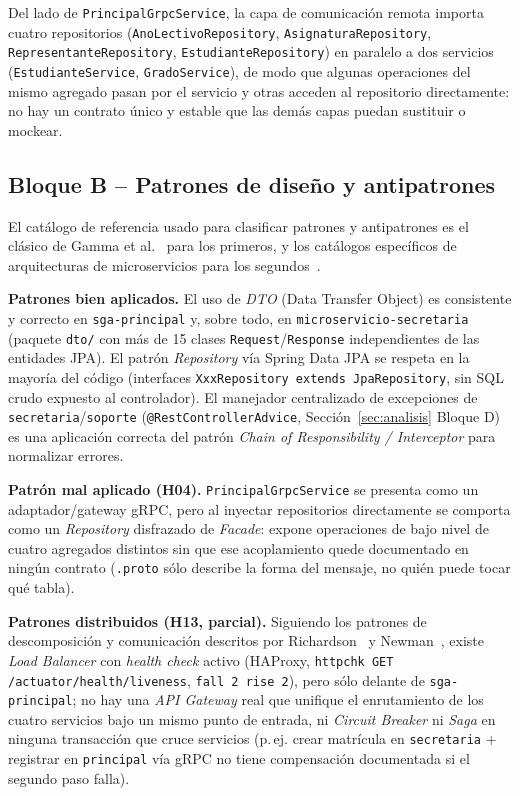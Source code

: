 \documentclass[11pt,a4paper]{article}
\begin{document}
    Del lado de \texttt{PrincipalGrpcService}, la capa de comunicaci\'on remota importa cuatro repositorios (\texttt{AnoLectivoRepository}, \texttt{AsignaturaRepository}, \texttt{RepresentanteRepository}, \texttt{EstudianteRepository}) en paralelo a dos servicios (\texttt{EstudianteService}, \texttt{GradoService}), de modo que algunas operaciones del mismo agregado pasan por el servicio y otras acceden al repositorio directamente: no hay un contrato \'unico y estable que las dem\'as capas puedan sustituir o mockear.

    \subsection{Bloque B -- Patrones de dise\~no y antipatrones}

    El cat\'alogo de referencia usado para clasificar patrones y antipatrones es el cl\'asico de Gamma et al.~\cite{gamma1994} para los primeros, y los cat\'alogos espec\'ificos de arquitecturas de microservicios para los segundos~\cite{cerny2023,tighilt2023,taibi2018}.

    \textbf{Patrones bien aplicados.} El uso de \emph{DTO} (Data Transfer Object) es consistente y correcto en \texttt{sga-principal} y, sobre todo, en \texttt{microservicio-secretaria} (paquete \texttt{dto/} con m\'as de 15 clases \texttt{Request}/\texttt{Response} independientes de las entidades JPA). El patr\'on \emph{Repository} v\'ia Spring Data JPA se respeta en la mayor\'ia del c\'odigo (interfaces \texttt{XxxRepository extends JpaRepository}, sin SQL crudo expuesto al controlador). El manejador centralizado de excepciones de \texttt{secretaria}/\texttt{soporte} (\texttt{@RestControllerAdvice}, Secci\'on~\ref{sec:analisis} Bloque D) es una aplicaci\'on correcta del patr\'on \emph{Chain of Responsibility / Interceptor} para normalizar errores.

    \textbf{Patr\'on mal aplicado (H04).} \texttt{PrincipalGrpcService} se presenta como un adaptador/gateway gRPC, pero al inyectar repositorios directamente se comporta como un \emph{Repository} disfrazado de \emph{Facade}: expone operaciones de bajo nivel de cuatro agregados distintos sin que ese acoplamiento quede documentado en ning\'un contrato (\texttt{.proto} s\'olo describe la forma del mensaje, no qui\'en puede tocar qu\'e tabla).

    \textbf{Patrones distribuidos (H13, parcial).} Siguiendo los patrones de descomposici\'on y comunicaci\'on descritos por Richardson~\cite{richardson2018} y Newman~\cite{newman2021}, existe \emph{Load Balancer} con \emph{health check} activo (HAProxy, \texttt{httpchk GET /actuator/health/liveness}, \texttt{fall 2 rise 2}), pero s\'olo delante de \texttt{sga-principal}; no hay una \emph{API Gateway} real que unifique el enrutamiento de los cuatro servicios bajo un mismo punto de entrada, ni \emph{Circuit Breaker} ni \emph{Saga} en ninguna transacci\'on que cruce servicios (p.\,ej. crear matr\'icula en \texttt{secretaria} + registrar en \texttt{principal} v\'ia gRPC no tiene compensaci\'on documentada si el segundo paso falla).
\end{document}
